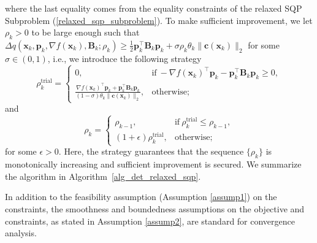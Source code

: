 \documentclass[aos]{imsart}
\numberwithin{equation}{section}
\theoremstyle{plain}
\begin{document}
where the last equality comes from the equality constraints of the relaxed SQP Subproblem (\ref{relaxed_sqp_subproblem}). 
To make sufficient improvement, we let $\rho_k>0$ to be large enough such that
$\Delta q(\bm{x}_k,\bm{p}_k,\nabla f(\bm{x}_k),\bm{B}_k;\rho_k) \geq \frac{1}{2} \bm{p}_k^{\top} \bm{B}_k \bm{p}_k + \sigma \rho_k \theta_k \|\bm{c}(\bm{x}_k)\|_2$ for some $\sigma \in (0,1)$, i.e., we introduce the following strategy
\begin{equation*}
        \rho_k^{\text{trial}} = \left \{ \begin{array}{cc}
           0,  & \text{if}~ -\nabla f(\bm{x}_k)^{\top} \bm{p}_k - \bm{p}_k^{\top} \bm{B}_k \bm{p}_k \geq 0, \\
           \frac{\nabla f(\bm{x}_k)^{\top} \bm{p}_k + \bm{p}_k^{\top} \bm{B}_k \bm{p}_k}{(1-\sigma)\theta_k \|\bm{c}(\bm{x}_k)\|_2},  &  \text{otherwise;}
        \end{array}\right.
\end{equation*}
and
\begin{equation*}
    \rho_k = \left\{ \begin{array}{cc}
        \rho_{k-1}, &  \text{if}~\rho_{k}^{\text{trial}} \leq \rho_{k-1}, \\
        (1+\epsilon)\rho_{k}^{\text{trial}}, & \text{otherwise};
    \end{array} \right.
\end{equation*}
for some $\epsilon > 0$. Here, the strategy guarantees that the sequence $\{\rho_k\}$ is monotonically increasing and sufficient improvement is secured. 
We summarize the algorithm in Algorithm~\ref{alg_det_relaxed_sqp}.

In addition to the feasibility assumption (Assumption \ref{assump1}) on the constraints, the smoothness and boundedness assumptions on the objective and constraints, as stated in Assumption \ref{assump2}, are standard for convergence analysis. 
\end{document}
